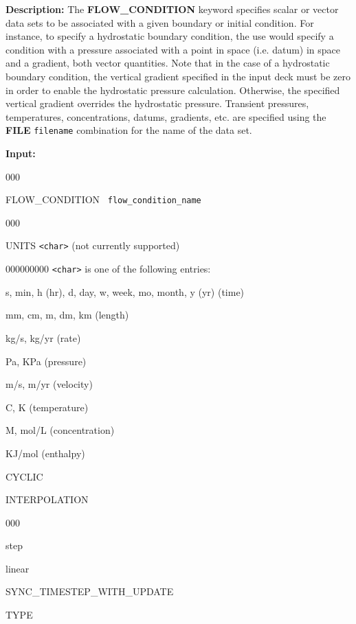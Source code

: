{\noindent\bf Description:}
The {\bf FLOW\_CONDITION} keyword specifies scalar or vector data sets to be associated with a given boundary or initial condition.  For instance, to specify a hydrostatic boundary condition, the use would specify a condition with a pressure associated with a point in space (i.e. datum) in space and a gradient, both vector quantities.  Note that in the case of a hydrostatic boundary condition, the vertical gradient specified in the input deck must be zero in order to enable the hydrostatic pressure calculation.  Otherwise, the specified vertical gradient overrides the hydrostatic pressure.  Transient pressures, temperatures, concentrations, datums, gradients, etc. are specified using the {\bf FILE} {\tt filename} combination for the name of the data set.

{\noindent\bf Input:}
\begin{deflist}{000}
\item [FLOW\_CONDITION] \ {\tt flow\_condition\_name}
\begin{deflist}{000}
\item [UNITS] {\tt <char>} (not currently supported)
\begin{deflist}{000000000}
{\tt <char>} is one of the following entries:
\item[s, min, h (hr), d, day, w, week, mo, month, y (yr)] (time)
\item[mm, cm, m, dm, km] (length)
\item[kg/s, kg/yr] (rate)
\item[Pa, KPa] (pressure)
\item[m/s, m/yr] (velocity)
\item[C, K] (temperature)
\item[M, mol/L] (concentration)
\item[KJ/mol] (enthalpy)
\end{deflist}


\item[CYCLIC] 

\item[INTERPOLATION] ~
\begin{deflist}{000}
\item[step]
\item[linear]
\end{deflist}

\item[SYNC\_TIMESTEP\_WITH\_UPDATE] ~

\item[TYPE] ~


\end{deflist}
\end{deflist}
